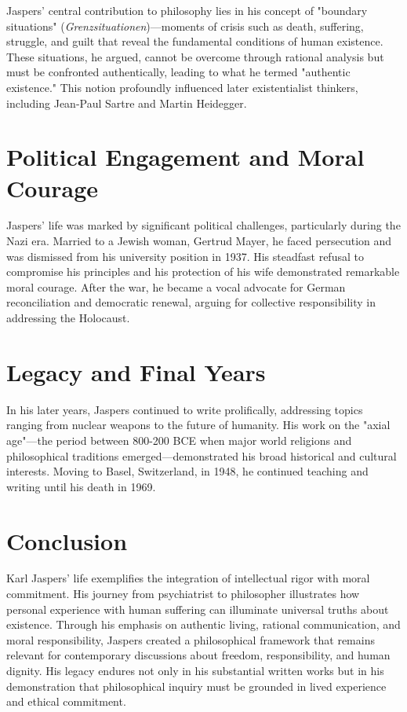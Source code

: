 \documentclass[12pt,a4paper]{article}
\begin{document}
Jaspers' central contribution to philosophy lies in his concept of "boundary situations" (\textit{Grenzsituationen})—moments of crisis such as death, suffering, struggle, and guilt that reveal the fundamental conditions of human existence. These situations, he argued, cannot be overcome through rational analysis but must be confronted authentically, leading to what he termed "authentic existence." This notion profoundly influenced later existentialist thinkers, including Jean-Paul Sartre and Martin Heidegger.

\section*{Political Engagement and Moral Courage}

Jaspers' life was marked by significant political challenges, particularly during the Nazi era. Married to a Jewish woman, Gertrud Mayer, he faced persecution and was dismissed from his university position in 1937. His steadfast refusal to compromise his principles and his protection of his wife demonstrated remarkable moral courage. After the war, he became a vocal advocate for German reconciliation and democratic renewal, arguing for collective responsibility in addressing the Holocaust.

\section*{Legacy and Final Years}

In his later years, Jaspers continued to write prolifically, addressing topics ranging from nuclear weapons to the future of humanity. His work on the "axial age"—the period between 800-200 BCE when major world religions and philosophical traditions emerged—demonstrated his broad historical and cultural interests. Moving to Basel, Switzerland, in 1948, he continued teaching and writing until his death in 1969.

\section*{Conclusion}

Karl Jaspers' life exemplifies the integration of intellectual rigor with moral commitment. His journey from psychiatrist to philosopher illustrates how personal experience with human suffering can illuminate universal truths about existence. Through his emphasis on authentic living, rational communication, and moral responsibility, Jaspers created a philosophical framework that remains relevant for contemporary discussions about freedom, responsibility, and human dignity. His legacy endures not only in his substantial written works but in his demonstration that philosophical inquiry must be grounded in lived experience and ethical commitment.
\end{document}
